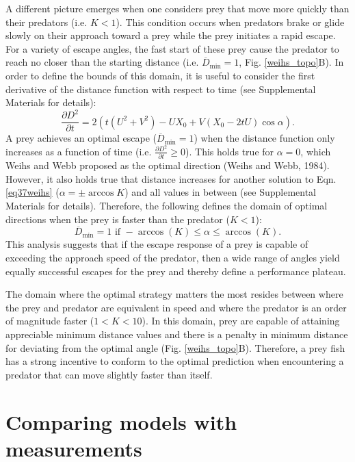 \documentclass[12pt]{article}
\def\d{\partial}
\newcommand{\ol}{\overline}
\begin{document}
A different picture emerges when one considers prey that move more quickly than their predators (i.e. $K<1$). This condition occurs when predators brake or glide slowly on their approach toward a prey \citep{Higham:2007go, Higham:2005iu} while the prey initiates a rapid escape. 
For a variety of escape angles, the fast start of these prey cause the predator to reach no closer than the starting distance (i.e. $\ol D_{\text{min}}=1$, Fig. \ref{weihs_topo}B). In order to define the bounds of this domain, it is useful to consider the first derivative of the distance function with respect to time (see Supplemental Materials for details):
%
\begin{equation}
\frac{\d D^2}{\d t}= 2(t(U^2+V^2) - UX_0 + V(X_0-2tU)\cos\alpha).
\label{distderivative}
\end{equation}  
%
A prey achieves an optimal escape ($\ol D_{\text{min}}=1$) when the distance function only increases as a function of time (i.e. $\frac{\d D^2}{\d t}\geq0$). This holds true for $\alpha=0$, which Weihs and Webb proposed as the optimal direction (Weihs and Webb, 1984). 
However, it also holds true that distance increases for another solution to Eqn. \ref{eq37weihs} ($\alpha= \pm \arccos K$) and all values in between (see Supplemental Materials for details). Therefore, the following defines the domain of optimal directions when the prey is faster than the predator ($K<1$):
%
\begin{equation}
\ol D_{\text{min}}=1 \text{ if } -\arccos(K) \leq \alpha \leq \arccos(K).
\label{anglerange}
\end{equation}
%
This analysis suggests that if the escape response of a prey is capable of exceeding the approach speed of the predator, then a wide range of angles yield equally successful escapes for the prey and thereby define a performance plateau. 

The domain where the optimal strategy matters the most resides between where the prey and predator are equivalent in speed and where the predator is an order of magnitude faster ($1<K<10$). 
In this domain, prey are capable of attaining appreciable minimum distance values and there is a penalty in minimum distance for deviating from the optimal angle (Fig. \ref{weihs_topo}B). 
Therefore, a prey fish has a strong incentive to conform to the optimal prediction when encountering a predator that can move slightly faster than itself.


\section{Comparing models with measurements}
\end{document}

